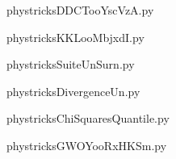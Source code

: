     \newcommand{\CaptionFigDDCTooYscVzA}{<+Type your caption here+>}
    \begin{center}
        
    \end{center}
    phystricksDDCTooYscVzA.py

    

    \clearpage
    


    \newcommand{\CaptionFigKKLooMbjxdI}{<+Type your caption here+>}
    \begin{center}
        
    \end{center}
    phystricksKKLooMbjxdI.py

    

    \clearpage
    


    \newcommand{\CaptionFigSuiteUnSurn}{<+Type your caption here+>}
    \begin{center}
        
    \end{center}
    phystricksSuiteUnSurn.py

    

    \clearpage
    


    \newcommand{\CaptionFigDivergenceUn}{<+Type your caption here+>}
    \begin{center}
        
    \end{center}
    phystricksDivergenceUn.py

    

    \clearpage
    


    \newcommand{\CaptionFigChiSquaresQuantile}{<+Type your caption here+>}
    \begin{center}
        
    \end{center}
    phystricksChiSquaresQuantile.py

    

    \clearpage
    


    \newcommand{\CaptionFigGWOYooRxHKSm}{<+Type your caption here+>}
    \begin{center}
        
    \end{center}
    phystricksGWOYooRxHKSm.py

